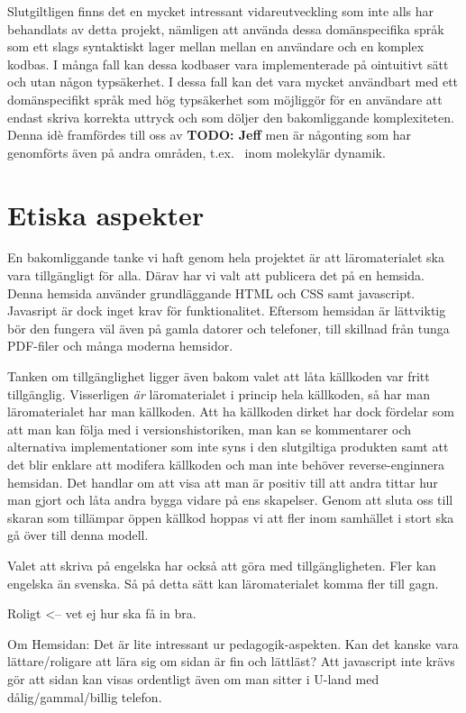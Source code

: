 \begin{binge}

Slutgiltligen finns det en mycket intressant vidareutveckling som inte alls har
behandlats av detta projekt, nämligen att använda dessa domänspecifika språk som
ett slags syntaktiskt lager mellan mellan en användare och en komplex kodbas. I
många fall kan dessa kodbaser vara implementerade på ointuitivt sätt och utan
någon typsäkerhet. I dessa fall kan det vara mycket användbart med ett
domänspecifikt språk med hög typsäkerhet som möjliggör för en användare att
endast skriva korrekta uttryck och som döljer den bakomliggande komplexiteten.
Denna idè framfördes till oss av \textbf{TODO: Jeff} men är någonting som har
genomförts även på andra områden, t.ex.~ inom molekylär dynamik\cite{MD}.

\section{Etiska aspekter}

En bakomliggande tanke vi haft genom hela projektet är att läromaterialet ska
vara tillgängligt för alla. Därav har vi valt att publicera det på en hemsida.
Denna hemsida använder grundläggande HTML och CSS samt javascript. Javasript är
dock inget krav för funktionalitet. Eftersom hemsidan är lättviktig bör den
fungera väl även på gamla datorer och telefoner, till skillnad från tunga
PDF-filer och många moderna hemsidor.

Tanken om tillgänglighet ligger även bakom valet att låta källkoden var fritt
tillgänglig. Visserligen \textit{är} läromaterialet i princip hela källkoden, så
har man läromaterialet har man källkoden. Att ha källkoden dirket har dock
fördelar som att man kan följa med i versionshistoriken, man kan se kommentarer
och alternativa implementationer som inte syns i den slutgiltiga produkten samt
att det blir enklare att modifera källkoden och man inte behöver
reverse-enginnera hemsidan. Det handlar om att visa att man är positiv till att
andra tittar hur man gjort och låta andra bygga vidare på ens skapelser. Genom
att sluta oss till skaran som tillämpar öppen källkod hoppas vi att fler inom
samhället i stort ska gå över till denna modell.

Valet att skriva på engelska har också att göra med tillgängligheten. Fler kan
engelska än svenska. Så på detta sätt kan läromaterialet komma fler till gagn.

Roligt <-- vet ej hur ska få in bra.

Om Hemsidan:
  Det är lite intressant ur pedagogik-aspekten. Kan det
  kanske vara lättare/roligare att lära sig om sidan är fin och
  lättläst? Att javascript inte krävs gör att sidan kan visas ordentligt
  även om man sitter i U-land med dålig/gammal/billig telefon.

\end{binge}

